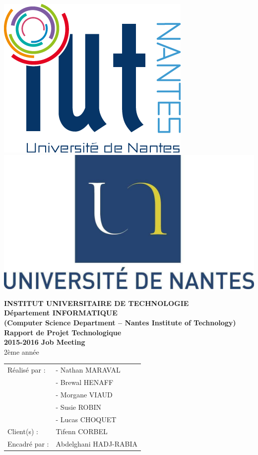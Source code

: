 \documentclass[12pt,a4paper]{article}
\begin{document}
\thispagestyle{empty}

\includegraphics[scale=0.4, valign=left]{logo_UnivNantes.png}
\includegraphics[scale=0.2, valign=right]{iutNantes.jpg}

\begin{center}
\bigbreak
\begin{large}
\textbf{INSTITUT UNIVERSITAIRE DE TECHNOLOGIE \\Département INFORMATIQUE \\(Computer Science Department – Nantes Institute of Technology)
\bigbreak
Rapport de Projet Technologique \\2015-2016
\bigbreak
Job Meeting}
\\2ème année
\end{large}
\end{center}

\begin{tabular}{C{8cm}L{5cm}}
Réalisé par : & - Nathan MARAVAL \\
 & - Brewal HENAFF\\
 & - Morgane VIAUD\\
 & - Susie ROBIN\\
 & - Lucas CHOQUET\\
Client(s) : & Tifenn CORBEL\\
Encadré par : & Abdelghani HADJ-RABIA
\end{tabular}
\end{document}
